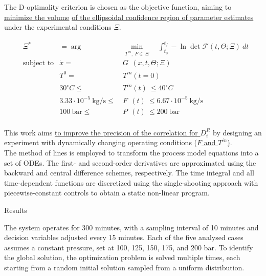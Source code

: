 \documentclass[a0,portrait]{a0poster}
\begin{document}
\begin{multicols}{2}
\begin{tcolorbox}[width=\linewidth, boxrule=0mm, sharp corners=all, colback=white]
The D-optimality criterion is chosen as the objective function, aiming to \underline{minimize the volume} \underline{of the ellipsoidal confidence region of parameter estimates} under the experimental conditions $\Xi$.

\begin{equation*}
	\begin{aligned} 
		&\Xi^* &= \arg &\min_{ T^{in},~F\in~\Xi}\quad\int_{t_0}^{t_f} - \ln \det \mathcal{F}(t,\Theta; \Xi)~dt  \\
		&\text{subject to}
		& \dot{x} = ~&G~~(x,t,\Theta;\Xi) \\
		&& T^{0} = ~&T^{in}(t=0) \\
		&& 30^\circ C \leq ~&T^{in}(t) ~ \leq 40^\circ C \\
		&& 3.33 \cdot 10^{-5}~\text{kg/s} \leq ~&F~~(t)~ \leq 6.67 \cdot 10^{-5}~\text{kg/s}\\
		&& 100~\text{bar} \leq ~&P~~(t)~ \leq 200~\text{bar} \\
	\end{aligned}
\end{equation*}

This work aims \underline{to improve the precision of the correlation for $D_i^R$} by designing an experiment with dynamically changing operating conditions (\underline{$F$ and $T^{in}$)}. \\

The method of lines is employed to transform the process model equations into a set of ODEs. The first- and second-order derivatives are approximated using the backward and central difference schemes, respectively. The time integral and all time-dependent functions are discretized using the single-shooting approach with piecewise-constant controls to obtain a static non-linear program.
\end{tcolorbox}


\begin{tcolorbox}[width=\linewidth, boxrule=0mm, sharp corners=all, colback=white]
	{\LARGE Results\\}
	
	The system operates for 300 minutes, with a sampling interval of 10 minutes and decision variables adjusted every 15 minutes. Each of the five analysed cases assumes a constant pressure, set at 100, 125, 150, 175, and 200 bar. To identify the global solution, the optimization problem is solved multiple times, each starting from a random initial solution sampled from a uniform distribution. %
	

\end{tcolorbox}
\end{multicols}
\end{document}
